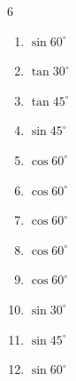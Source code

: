 \begin{multicols}{6}
\begin{enumerate}

  \item $\displaystyle \sin{60^\circ}$


  \item $\displaystyle \tan{30^\circ}$


  \item $\displaystyle \tan{45^\circ}$

        \phantom{$\displaystyle =1$}

  \item $\displaystyle \sin{45^\circ}$


  \item $\displaystyle \cos{60^\circ}$


  \item $\displaystyle \cos{60^\circ}$


  \item $\displaystyle \cos{60^\circ}$


  \item $\displaystyle \cos{60^\circ}$


  \item $\displaystyle \cos{60^\circ}$


  \item $\displaystyle \sin{30^\circ}$


  \item $\displaystyle \sin{45^\circ}$


  \item $\displaystyle \sin{60^\circ}$



\end{enumerate}
\end{multicols}
